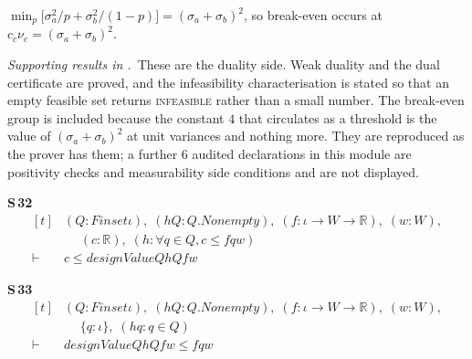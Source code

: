 \begin{theorem}
\label{thm:fn-breakeven}
$\min_{p}\bigl[\sigma_{a}^{2}/p+\sigma_{b}^{2}/(1-p)\bigr]=(\sigma_{a}+\sigma_{b})^{2}$, so
break-even occurs at $c_{c}\nu_{c}=(\sigma_{a}+\sigma_{b})^{2}$.
\end{theorem}


\noindent\emph{Supporting results in .}~These are the duality side. Weak duality and the dual certificate are proved, and the infeasibility characterisation is stated so that an empty feasible set returns \textsc{infeasible} rather than a small number. The break-even group is included because the constant $4$ that circulates as a threshold is the value of $(\sigma_{a}+\sigma_{b})^{2}$ at unit variances and nothing more. They are reproduced as the prover has them; a further $6$ audited declarations in this module are positivity checks and measurability side conditions and are not displayed.

\noindent\textbf{S\,32}\quad{}
{\footnotesize\[ \begin{aligned}[t]
&(\mathit{Q} : \mathit{Finset} \iota ),\; (\mathit{hQ} : \mathit{Q}.\mathit{Nonempty}),\; (\mathit{f} : \iota \to \mathit{W} \to \mathbb{R} ),\; (\mathit{w} : \mathit{W}),\\
&\quad \; (\mathit{c} : \mathbb{R} ),\; (\mathit{h} : \forall \mathit{q} \in \mathit{Q}, \mathit{c} \leq \mathit{f} \mathit{q} \mathit{w})\\
\vdash\;&\mathit{c} \leq \mathit{designValue} \mathit{Q} \mathit{hQ} \mathit{f} \mathit{w}
\end{aligned} \]}

\noindent\textbf{S\,33}\quad{}
{\footnotesize\[ \begin{aligned}[t]
&(\mathit{Q} : \mathit{Finset} \iota ),\; (\mathit{hQ} : \mathit{Q}.\mathit{Nonempty}),\; (\mathit{f} : \iota \to \mathit{W} \to \mathbb{R} ),\; (\mathit{w} : \mathit{W}),\\
&\quad \; \{ \mathit{q} : \iota \},\; (\mathit{hq} : \mathit{q} \in \mathit{Q})\\
\vdash\;&\mathit{designValue} \mathit{Q} \mathit{hQ} \mathit{f} \mathit{w} \leq \mathit{f} \mathit{q} \mathit{w}
\end{aligned} \]}

